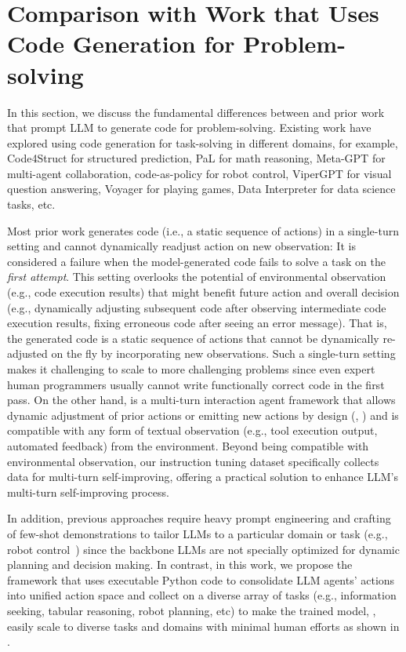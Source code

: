 \section{Comparison with Work that Uses Code Generation for Problem-solving}
\label{sec:prior_code_action_work}

In this section, we discuss the fundamental differences between \approach and prior work that prompt LLM to generate code for problem-solving. 
% 
Existing work have explored using code generation for task-solving in different domains, for example, Code4Struct \citep{wang-etal-2023-code4struct} for structured prediction, PaL \citep{gao2023pal} for math reasoning, Meta-GPT \citep{hong2023metagpt} for multi-agent collaboration, code-as-policy \citep{codeaspolicies2022} for robot control, ViperGPT \citep{surismenon2023vipergpt} for visual question answering, Voyager \citep{wang2023voyager} for playing games, Data Interpreter \citep{hong2024data} for data science tasks, etc.

Most prior work generates code (i.e., a static sequence of actions) in a single-turn setting and cannot dynamically readjust action on new observation: It is considered a failure when the model-generated code fails to solve a task on the \textit{first attempt}.
% 
This setting overlooks the potential of environmental observation (e.g., code execution results) that might benefit future action and overall decision (e.g., dynamically adjusting subsequent code after observing intermediate code execution results, fixing erroneous code after seeing an error message).
% 
That is, the generated code is a static sequence of actions that cannot be dynamically re-adjusted on the fly by incorporating new observations.
% 
Such a single-turn setting makes it challenging to scale to more challenging problems since even expert human programmers usually cannot write functionally correct code in the first pass.
% 
On the other hand, \approach is a multi-turn interaction agent framework that allows dynamic adjustment of prior actions or emitting new actions by design (, ) and is compatible with any form of textual observation (e.g., tool execution output, automated feedback) from the environment.
% 
Beyond being compatible with environmental observation, our instruction tuning dataset \dataname specifically collects data for multi-turn self-improving, offering a practical solution to enhance LLM's multi-turn self-improving process.


In addition, previous approaches require heavy prompt engineering and crafting of few-shot demonstrations to tailor LLMs to a particular domain or task (e.g., robot control~\citep{codeaspolicies2022}) since the backbone LLMs are not specially optimized for dynamic planning and decision making.
% 
In contrast, in this work, we propose the \approach framework that uses executable Python code to consolidate LLM agents' actions into unified action space and collect \dataname on a diverse array of tasks (e.g., information seeking, tabular reasoning, robot planning, etc) to make the trained model, \modelname, easily scale to diverse tasks and domains with minimal human efforts as shown in . 

